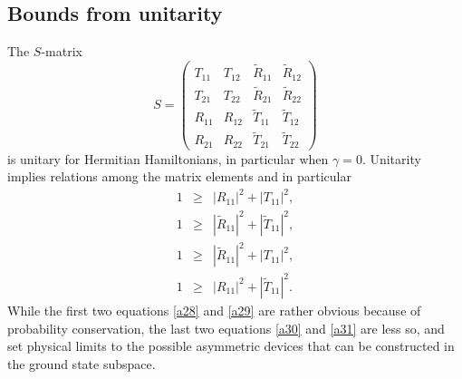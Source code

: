 \subsection{Bounds from unitarity}
%
The $S$-matrix
%
\begin{equation}
	S=\left(\begin{array}{cccc}
	T_{11}&T_{12}&\widetilde R_{11}&\widetilde R_{12}
	\\
	T_{21}&T_{22}&\widetilde R_{21}&\widetilde R_{22}
	\\
	R_{11}&R_{12}&\widetilde T_{11}&\widetilde T_{12}
	\\
	R_{21}&R_{22}&\widetilde T_{21}&\widetilde T_{22}
	\end{array}\right)
\end{equation}
%
is unitary for Hermitian Hamiltonians,  in particular when $\gamma=0$.
Unitarity implies relations among the matrix elements and in particular
%
\begin{eqnarray}
	1&\ge& |R_{11} |^2+|T_{11} |^2,\label{a28}
	\\
	1&\ge& |\widetilde R_{11}|^2+|\widetilde T_{11}|^2, \label{a29}
	\\
	1&\ge& |\widetilde R_{11} |^2+|T_{11} |^2,
	\label{a30}\\
	1&\ge& |R_{11} |^2+|\widetilde T_{11}|^2.\label{a31}
\end{eqnarray}
%
While the first two equations \eqref{a28} and \eqref{a29} are rather obvious because of  probability conservation, the last two equations
\eqref{a30} and \eqref{a31} are less so, and
set physical  limits to the possible asymmetric devices that can be constructed in the ground state subspace.
%

